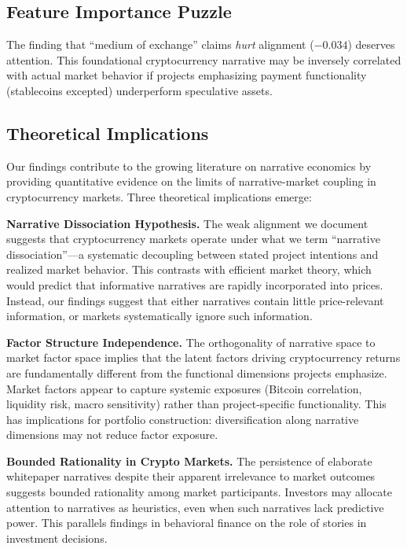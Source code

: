 \documentclass[11pt,twocolumn]{article}
\begin{document}
\subsection{Feature Importance Puzzle}

The finding that ``medium of exchange'' claims \textit{hurt} alignment ($-0.034$) deserves attention. This foundational cryptocurrency narrative may be inversely correlated with actual market behavior if projects emphasizing payment functionality (stablecoins excepted) underperform speculative assets.

\subsection{Theoretical Implications}

Our findings contribute to the growing literature on narrative economics \citep{shiller2017narrative} by providing quantitative evidence on the limits of narrative-market coupling in cryptocurrency markets. Three theoretical implications emerge:

\textbf{Narrative Dissociation Hypothesis.} The weak alignment we document suggests that cryptocurrency markets operate under what we term ``narrative dissociation''---a systematic decoupling between stated project intentions and realized market behavior. This contrasts with efficient market theory, which would predict that informative narratives are rapidly incorporated into prices. Instead, our findings suggest that either narratives contain little price-relevant information, or markets systematically ignore such information.

\textbf{Factor Structure Independence.} The orthogonality of narrative space to market factor space implies that the latent factors driving cryptocurrency returns are fundamentally different from the functional dimensions projects emphasize. Market factors appear to capture systemic exposures (Bitcoin correlation, liquidity risk, macro sensitivity) rather than project-specific functionality. This has implications for portfolio construction: diversification along narrative dimensions may not reduce factor exposure.

\textbf{Bounded Rationality in Crypto Markets.} The persistence of elaborate whitepaper narratives despite their apparent irrelevance to market outcomes suggests bounded rationality among market participants. Investors may allocate attention to narratives as heuristics, even when such narratives lack predictive power. This parallels findings in behavioral finance on the role of stories in investment decisions.
\end{document}
